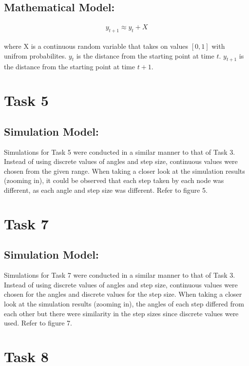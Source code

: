 \documentclass[8pt]{extarticle}
\begin{document}
\subsection*{Mathematical Model:}
\begin{align*}
    y_{t+1} \approx y_{t} + X
\end{align*}

where X is a continuous random variable that takes on values $[0, 1]$ with unifrom probabilites.
$y_t$ is the distance from the starting point at time $t$. $y_{t+1}$ is the distance from the starting point at time $t+1$.


\section*{Task 5}
\subsection*{Simulation Model:}
Simulations for Task 5 were conducted in a similar manner to that of Task 3. Instead of using discrete values of angles and step size, continuous values were chosen from the given range. When taking a closer look at the simulation results (zooming in), it could be observed that each step taken by each node was different, as each angle and step size was different. 
Refer to figure 5.


\section*{Task 7}
\subsection*{Simulation Model:}
Simulations for Task 7 were conducted in a similar manner to that of Task 3. Instead of using discrete values of angles and step size, continuous values were chosen for the angles and discrete values for the step size. When taking a closer look at the simulation results (zooming in), the angles of each step differed from each other but there were similarity in the step sizes since discrete values were used.
Refer to figure 7.


\section*{Task 8}
\end{document}
